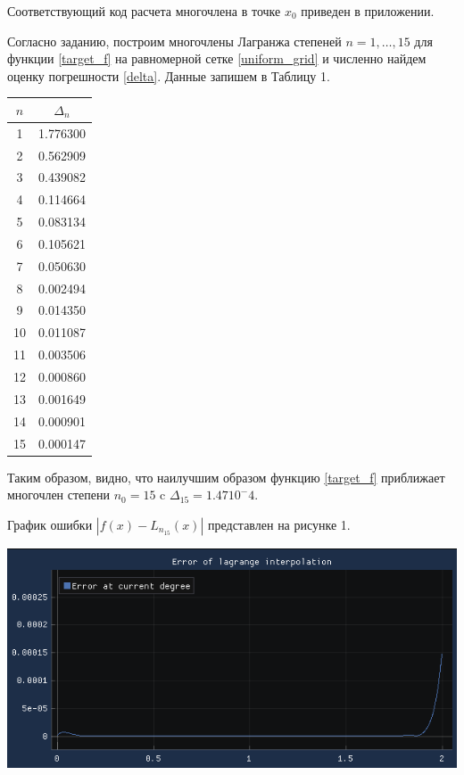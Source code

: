 \documentclass[a4paper, fontsize=14pt]{article}
\begin{document}
Соответствующий код расчета многочлена в точке $x_0$ приведен в приложении.

Согласно заданию, построим многочлены Лагранжа степеней $n=1,\dots,15$ для функции \eqref{target_f} на равномерной сетке \eqref{uniform_grid} и численно найдем оценку погрешности \eqref{delta}. Данные запишем в Таблицу 1.
\begin{center}
    \begin{tabular}{|c | c |} 
     \hline
     $n$ & $\Delta_n $\\ \hline 
     1    &   1.776300\\ \hline
     2    &   0.562909\\ \hline
     3    &   0.439082\\ \hline
     4    &   0.114664\\ \hline
     5    &   0.083134\\ \hline
     6    &   0.105621\\ \hline
     7    &   0.050630\\ \hline
     8    &   0.002494\\ \hline
     9    &   0.014350\\ \hline
     10   &   0.011087\\ \hline
     11   &   0.003506\\ \hline
     12   &   0.000860\\ \hline
     13   &   0.001649\\ \hline
     14   &   0.000901\\ \hline
     15   &   0.000147\\ \hline
    \end{tabular}
    \label{Table:errorofLagrange}
    \end{center}

    Таким образом, видно, что наилучшим образом функцию \eqref{target_f} приближает многочлен степени $n_0=15$ c $\Delta_{15} = 1.47 10^-4$. 
    
    График ошибки $| f(x)-L_{n_{15}}(x) |$ представлен на рисунке 1.
    
    \begin{center}
        \label{delta_15}
        \includegraphics[]{src/lagrange_n_15_error.png}
    \end{center}
    
\end{document}

